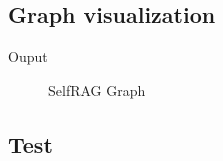 \documentclass[letterpaper,11pt,english]{sphinxmanual}
\begin{document}
\subsection{Graph visualization}
\label{\detokenize{rag:graph-visualization}}
\begin{sphinxVerbatim}[commandchars=\\\{\}]
    

\end{sphinxVerbatim}

\sphinxAtStartPar
Ouput

\begin{figure}[htbp]
\centering
\capstart

\noindent{}
\caption{Self\sphinxhyphen{}RAG Graph}\label{\detokenize{rag:id43}}\label{\detokenize{rag:fig-self-rag-graph}}\end{figure}


\subsection{Test}
\label{\detokenize{rag:test}}
\end{document}
